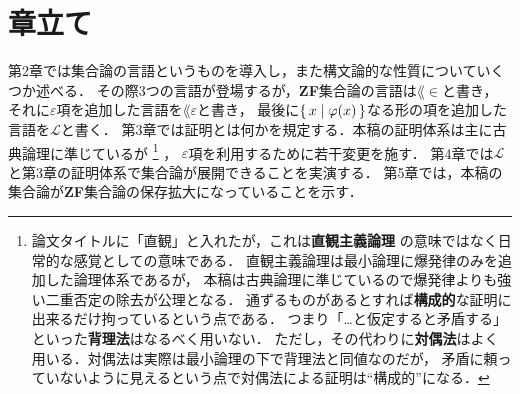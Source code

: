 \section{章立て}
	第2章では集合論の言語というものを導入し，また構文論的な性質についていくつか述べる．
	その際3つの言語が登場するが，{\bf ZF}集合論の言語は$\lang{\in}$と書き，
	それに$\varepsilon$項を追加した言語を$\lang{\varepsilon}$と書き，
	最後に$\{\, x \mid \varphi(x)\, \}$なる形の項を追加した言語を$\mathcal{L}$と書く．
	第3章では証明とは何かを規定する．本稿の証明体系は主に古典論理に準じているが
	\footnote{
		論文タイトルに「直観」と入れたが，これは{\bf 直観主義論理}
		の意味ではなく日常的な感覚としての意味である．
		直観主義論理は最小論理に爆発律のみを追加した論理体系であるが，
		本稿は古典論理に準じているので爆発律よりも強い二重否定の除去が公理となる．
		通ずるものがあるとすれば{\bf 構成的}な証明に出来るだけ拘っているという点である．
		つまり「…と仮定すると矛盾する」といった{\bf 背理法}はなるべく用いない．
		ただし，その代わりに{\bf 対偶法}はよく用いる．対偶法は実際は最小論理の下で背理法と同値なのだが，
		矛盾に頼っていないように見えるという点で対偶法による証明は``構成的''になる．
	}
	，
	$\varepsilon$項を利用するために若干変更を施す．
	第4章では$\mathcal{L}$と第3章の証明体系で集合論が展開できることを実演する．
	第5章では，本稿の集合論が{\bf ZF}集合論の保存拡大になっていることを示す．
	
